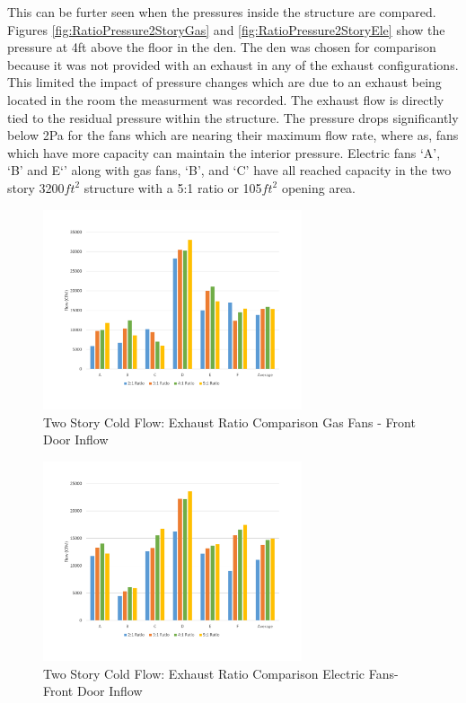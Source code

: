\documentclass{article}
\begin{document}
This can be furter seen when the pressures inside the structure are compared. Figures \ref{fig:RatioPressure2StoryGas} and \ref{fig:RatioPressure2StoryEle} show the pressure at 4ft above the floor in the den. The den was chosen for comparison because it was not provided with an exhaust in any of the exhaust configurations. This limited the impact of pressure changes which are due to an exhaust being located in the room the measurment was recorded. The exhaust flow is directly tied to the residual pressure within the structure. The pressure drops significantly below 2Pa for the fans which are nearing their maximum flow rate, where as, fans which have more capacity can maintain the interior pressure. Electric fans `A', `B' and E`' along with gas fans, `B', and `C' have all reached capacity in the two story 3200$ft^2$ structure with a 5:1 ratio or 105$ft^2$ opening area. 

\begin{figure}[H]
	\centering
	\includegraphics[width=3in]{0_Images/ColdFlow/Two_Story/RatioFlowDoorGas.pdf}
	\caption{Two Story Cold Flow: Exhaust Ratio Comparison Gas Fans - Front Door Inflow}
	\label{fig:RatioInflow2StoryGas}
\end{figure}

\begin{figure}[H]
	\centering
	\includegraphics[width=3in]{0_Images/ColdFlow/Two_Story/RatioFlowDoorEle.pdf}
	\caption{Two Story Cold Flow: Exhaust Ratio Comparison Electric Fans- Front Door Inflow}
	\label{fig:RatioInflow2StoryEle}
\end{figure}
\end{document}
